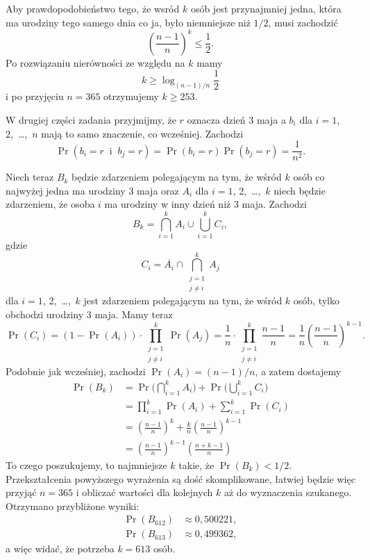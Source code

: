 Aby prawdopodobieństwo tego, że wsród $k$ osób jest przynajmniej jedna, która ma urodziny tego samego dnia co ja, było niemniejsze niż $1/2$, musi zachodzić
\[
	\left(\frac{n-1}{n}\right)^k \le \frac{1}{2}.
\]
Po rozwiązaniu nierówności ze względu na $k$ mamy
\[
	k \ge \log_{(n-1)/n}\frac{1}{2}
\]
i po przyjęciu $n=365$ otrzymujemy $k\ge253$.

W drugiej części zadania przyjmijmy, że $r$ oznacza dzień 3 maja a $b_i$ dla $i=1$, 2,~\dots,~$n$ mają to samo znaczenie, co wcześniej. Zachodzi
\[
	\Pr(b_i=r\;\;\text{i}\;\;b_j=r) = \Pr(b_i=r)\Pr(b_j=r) = \frac{1}{n^2}.
\]

Niech teraz $B_k$ będzie zdarzeniem polegającym na tym, że wśród $k$ osób co najwyżej jedna ma urodziny 3 maja oraz $A_i$ dla $i=1$, 2,~\dots,~$k$ niech będzie zdarzeniem, że osoba $i$ ma urodziny w inny dzień niż 3 maja. Zachodzi
\[
	B_k = \bigcap_{i=1}^kA_i\cup\bigcup_{i=1}^kC_i,
\]
gdzie
\[
	C_i = \overline{A_i}\cap\bigcap_{\substack{j=1\\j\ne i}}^kA_j
\]
dla $i=1$, 2,~\dots,~$k$ jest zdarzeniem polegającym na tym, że wśród $k$ osób, tylko  obchodzi urodziny 3 maja. Mamy teraz
\[
	\Pr(C_i) = (1-\Pr(A_i))\cdot\prod_{\substack{j=1\\j\ne i}}^k\Pr(A_j) = \frac{1}{n}\cdot\prod_{\substack{j=1\\j\ne i}}^k\frac{n-1}{n} = \frac{1}{n}\left(\frac{n-1}{n}\right)^{k-1}.
\]
Podobnie jak wcześniej, zachodzi $\Pr(A_i)=(n-1)/n$, a zatem dostajemy
\begin{align*}
	\Pr(B_k) &= \Pr\biggl(\bigcap_{i=1}^kA_i\biggr)+\Pr\biggl(\bigcup_{i=1}^kC_i\biggr) \\
	&= \prod_{i=1}^k\Pr(A_i)+\sum_{i=1}^k\Pr(C_i) \\
	&= \left(\frac{n-1}{n}\right)^k+\frac{k}{n}\left(\frac{n-1}{n}\right)^{k-1} \\
	&= \left(\frac{n-1}{n}\right)^{k-1}\left(\frac{n+k-1}{n}\right)
\end{align*}
To czego poszukujemy, to najmniejsze $k$ takie, że $\Pr(B_k)<1/2$. Przekształcenia powyższego wyrażenia są dość skomplikowane, łatwiej będzie więc przyjąć $n=365$ i obliczać wartości dla kolejnych $k$ aż do wyznaczenia szukanego. Otrzymano przybliżone wyniki:
\begin{align*}
    \Pr(B_{612}) &\approx 0{,}500221,\\
	\Pr(B_{613}) &\approx 0{,}499362,
\end{align*}
a więc widać, że potrzeba $k=613$ osób.

